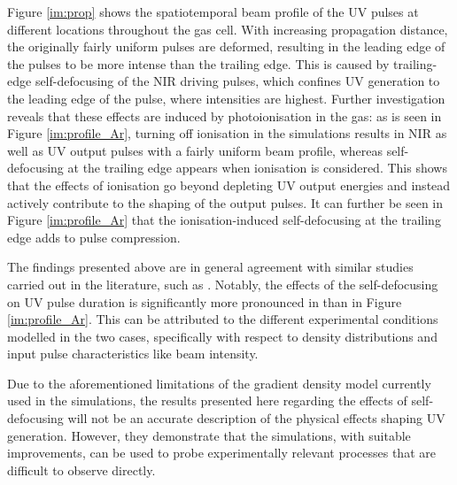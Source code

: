 \documentclass[a4paper]{jpconf}
\begin{document}
Figure \ref{im:prop} shows the spatiotemporal beam profile of the UV pulses at different locations throughout the gas cell. With increasing propagation distance, the originally fairly uniform pulses are deformed, resulting in the leading edge of the pulses to be more intense than the trailing edge. This is caused by trailing-edge self-defocusing of the NIR driving pulses, which confines UV generation to the leading edge of the pulse, where intensities are highest. Further investigation reveals that these effects are induced by photoionisation in the gas:  as is seen in Figure \ref{im:profile_Ar}, turning off ionisation in the simulations results in NIR as well as UV output pulses with a fairly uniform beam profile, whereas self-defocusing at the trailing edge appears when ionisation is considered. This shows that the effects of ionisation go beyond depleting UV output energies and instead actively contribute to the shaping of the output pulses. It can further be seen in Figure \ref{im:profile_Ar} that the ionisation-induced self-defocusing at the trailing edge adds to pulse compression. \par 
The findings presented above are in general agreement with similar studies carried out in the literature, such as \cite{reiter2010}.  Notably, the effects of the self-defocusing on UV pulse duration is significantly more pronounced in \cite{reiter2010} than in Figure \ref{im:profile_Ar}. This can be attributed to the different experimental conditions modelled in the two cases, specifically with respect to density distributions and input pulse characteristics like beam intensity. \par 
Due to the aforementioned limitations of the gradient density model currently used in the simulations, the results presented here regarding the effects of self-defocusing will not be an accurate description of the physical effects shaping UV generation. However, they demonstrate that the simulations, with suitable improvements, can be used to probe experimentally relevant processes that are difficult to observe directly. 
\end{document}
